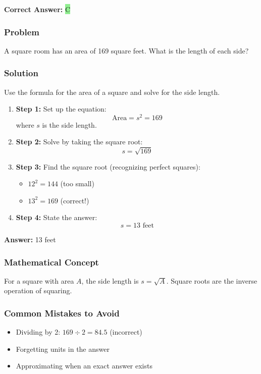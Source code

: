\documentclass[12pt]{article}
\begin{document}
\textbf{Correct Answer: } \colorbox{lightgreen}{C}

\subsubsection*{Problem}
A square room has an area of 169 square feet. What is the length of each side?

\subsubsection*{Solution}

Use the formula for the area of a square and solve for the side length.

\begin{enumerate}
\item \textbf{Step 1:} Set up the equation:
  \[
  \text{Area} = s^2 = 169
  \]
  where $s$ is the side length.
\item \textbf{Step 2:} Solve by taking the square root:
  \[
  s = \sqrt{169}
  \]
\item \textbf{Step 3:} Find the square root (recognizing perfect squares):
  \begin{itemize}
  \item $12^2 = 144$ (too small)
  \item $13^2 = 169$ (correct!)
  \end{itemize}
\item \textbf{Step 4:} State the answer:
  \[
  s = 13 \text{ feet}
  \]
\end{enumerate}

\textbf{Answer: } 13 feet

\subsubsection*{Mathematical Concept}
For a square with area $A$, the side length is $s = \sqrt{A}$. Square roots are the inverse operation of squaring.

\subsubsection*{Common Mistakes to Avoid}
\begin{itemize}
\item Dividing by 2: $169 \div 2 = 84.5$ (incorrect)
\item Forgetting units in the answer
\item Approximating when an exact answer exists
\end{itemize}
\end{document}
